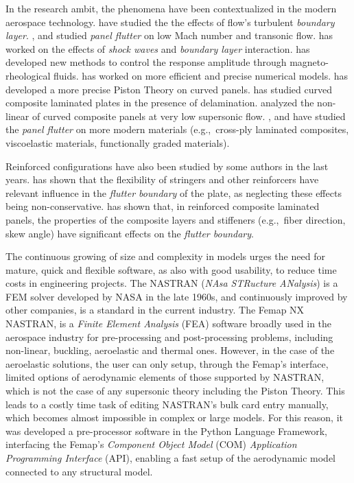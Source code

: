 In the research ambit, the phenomena have been contextualized in the modern aerospace technology. 
\citet{hashimoto_effects_2009} have studied the the effects of flow's turbulent \emph{boundary layer}.
\citet{alder_development_2015}, \citet{shishaeva_nonlinear_2015} and \citet{vedeneev_panel_2012} studied
\emph{panel flutter} on low Mach number and transonic flow.
\citet{shinde_panel_2018} has worked on the effects of \emph{shock waves} and \emph{boundary layer} interaction.
\citet{asgari_aeroelastic_2019} has developed new methods to control the response amplitude through magneto-rheological fluids.
\citet{cunha-filho_efficient_2018} has worked on more efficient and precise numerical models.
\citet{yang_integrated_2014} has developed a more precise Piston Theory on curved panels.
\citet{fazilati_panel_2018} has studied curved composite laminated plates in the presence of delamination.
\citet{an_nonlinear_2018} analyzed the non-linear of curved composite panels at very low supersonic flow.
\citet{yazdi_supersonic_2019}, \citet{khudayarov_nonlinear_2019} and \citet{kouchakzadeh_panel_2010} have studied the \emph{panel flutter} on more modern materials (e.g.,\ cross-ply laminated composites, viscoelastic materials, functionally graded materials).

Reinforced configurations have also been studied by some authors in the last years.
\citet{pacheco_finite_2018} has shown that the flexibility of stringers
and other reinforcers have relevant influence in the \emph{flutter boundary} of the plate,
as neglecting these effects being non-conservative.
\citet{liao_flutter_1993} has shown that, in reinforced composite laminated panels, %
the properties of the composite layers and stiffeners (e.g.,\ fiber direction, skew angle) have significant effects on the
\emph{flutter boundary}.

The continuous growing of size and complexity in models urges the need for mature, quick and flexible software, as also with good usability, to reduce time costs in engineering projects.
The NASTRAN (\emph{NAsa STRucture ANalysis}) is a FEM solver developed by NASA in the late 1960s, and continuously improved by other companies, is a standard in the current industry.
The Femap NX NASTRAN, is a \emph{Finite Element Analysis} (FEA) software broadly used in the aerospace industry for pre-processing and post-processing problems, including non-linear, buckling, aeroelastic and thermal ones.
However, in the case of the aeroelastic solutions, the user can only setup, through the Femap's interface, limited options of aerodynamic elements of those supported by NASTRAN, which is not the case of any supersonic theory including the Piston Theory.
This leads to a costly time task of editing NASTRAN's bulk card entry manually, which becomes almost impossible in complex or large models.
For this reason, it was developed a pre-processor software in the Python Language Framework, interfacing the Femap's \emph{Component Object Model} (COM) \emph{Application Programming Interface} (API), enabling a fast setup of the aerodynamic model connected to any structural model.

